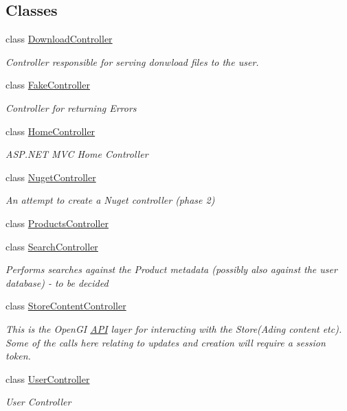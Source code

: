 \subsection*{Classes}
\begin{DoxyCompactItemize}
\item 
class \hyperlink{class_open_1_1_g_i_1_1hypermart_1_1_controllers_1_1_download_controller}{Download\+Controller}
\begin{DoxyCompactList}\small\item\em Controller responsible for serving donwload files to the user. \end{DoxyCompactList}\item 
class \hyperlink{class_open_1_1_g_i_1_1hypermart_1_1_controllers_1_1_fake_controller}{Fake\+Controller}
\begin{DoxyCompactList}\small\item\em Controller for returning Errors \end{DoxyCompactList}\item 
class \hyperlink{class_open_1_1_g_i_1_1hypermart_1_1_controllers_1_1_home_controller}{Home\+Controller}
\begin{DoxyCompactList}\small\item\em A\+S\+P.\+N\+ET M\+VC Home Controller \end{DoxyCompactList}\item 
class \hyperlink{class_open_1_1_g_i_1_1hypermart_1_1_controllers_1_1_nuget_controller}{Nuget\+Controller}
\begin{DoxyCompactList}\small\item\em An attempt to create a Nuget controller (phase 2) \end{DoxyCompactList}\item 
class \hyperlink{class_open_1_1_g_i_1_1hypermart_1_1_controllers_1_1_products_controller}{Products\+Controller}
\item 
class \hyperlink{class_open_1_1_g_i_1_1hypermart_1_1_controllers_1_1_search_controller}{Search\+Controller}
\begin{DoxyCompactList}\small\item\em Performs searches against the Product metadata (possibly also against the user database) -\/ to be decided \end{DoxyCompactList}\item 
class \hyperlink{class_open_1_1_g_i_1_1hypermart_1_1_controllers_1_1_store_content_controller}{Store\+Content\+Controller}
\begin{DoxyCompactList}\small\item\em This is the Open\+GI \hyperlink{namespace_open_1_1_g_i_1_1hypermart_1_1_controllers_1_1_a_p_i}{A\+PI} layer for interacting with the Store(\+Ading content etc). Some of the calls here relating to updates and creation will require a session token. \end{DoxyCompactList}\item 
class \hyperlink{class_open_1_1_g_i_1_1hypermart_1_1_controllers_1_1_user_controller}{User\+Controller}
\begin{DoxyCompactList}\small\item\em User Controller \end{DoxyCompactList}\end{DoxyCompactItemize}
